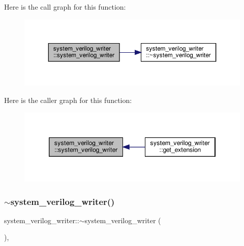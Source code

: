 Here is the call graph for this function\+:
\nopagebreak
\begin{figure}[H]
\begin{center}
\leavevmode
\includegraphics[width=350pt]{d5/d69/classsystem__verilog__writer_ad58c38bd3ac975232c9e99460873fd38_cgraph}
\end{center}
\end{figure}
Here is the caller graph for this function\+:
\nopagebreak
\begin{figure}[H]
\begin{center}
\leavevmode
\includegraphics[width=346pt]{d5/d69/classsystem__verilog__writer_ad58c38bd3ac975232c9e99460873fd38_icgraph}
\end{center}
\end{figure}
\mbox{\label{classsystem__verilog__writer_a622ed9f43f9cebfa936127d8a333fb53}} 
\subsubsection{\texorpdfstring{$\sim$system\+\_\+verilog\+\_\+writer()}{~system\_verilog\_writer()}}
{\footnotesize\ttfamily system\+\_\+verilog\+\_\+writer\+::$\sim$system\+\_\+verilog\+\_\+writer (\begin{DoxyParamCaption}{ }\end{DoxyParamCaption})\hspace{0.3cm}{\ttfamily [override]}, {\ttfamily [default]}}



